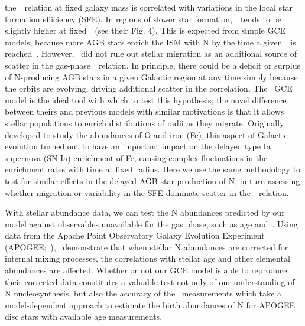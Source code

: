 \documentclass[ms.tex]{subfiles}
\begin{document}
the~\ohno~relation at fixed galaxy mass is correlated with variations in the
local star formation efficiency (SFE).
In regions of slower star formation,~\no~tends to be slightly higher at
fixed~\oh~(see their Fig. 4).
This is expected from simple GCE models, because more AGB stars enrich the
ISM with N by the time a given~\oh~is reached~\citep[e.g.][]{Molla2006,
Vincenzo2016a}.
However,~\citet{Schaefer2020} did not rule out stellar migration as an
additional source of scatter in the gas-phase~\ohno~relation.
In principle, there could be a deficit or surplus of N-producing AGB stars in a
given Galactic region at any time simply because the orbits are evolving,
driving additional scatter in the correlation.
The~\citet{Johnson2021} GCE model is the ideal tool with which to test this
hypothesis; the novel difference between theirs and previous models with
similar motivations is that it allows stellar populations to enrich
distributions of radii as they migrate.
Originally developed to study the abundances of O and iron (Fe), this aspect of
Galactic evolution turned out to have an important impact on the delayed type
Ia supernova (SN Ia) enrichment of Fe, causing complex fluctuations in the
enrichment rates with time at fixed radius.
Here we use the same methodology to test for similar effects in the delayed AGB
star production of N, in turn assessing whether migration or variability in the
SFE dominate scatter in the~\ohno~relation.
\par
With stellar abundance data, we can test the N abundances predicted by our
model against observables unavailable for the gas phase, such as age and~\ofe.
Using data from the Apache Point Observatory Galaxy Evolution Experiment
(APOGEE;~\citealp{Majewski2017}),~\citet{Vincenzo2021} demonstrate that when
stellar N abundances are corrected for internal mixing processes, the
correlations with stellar age and other elemental abundances are affected.
Whether or not our GCE model is able to reproduce their corrected data
constitutes a valuable test not only of our understanding of N nucleosynthesis,
but also the accuracy of the~\citet{Vincenzo2021} measurements which take a
model-dependent approach to estimate the birth abundances of N for APOGEE disc
stars with available age measurements.
\end{document}
